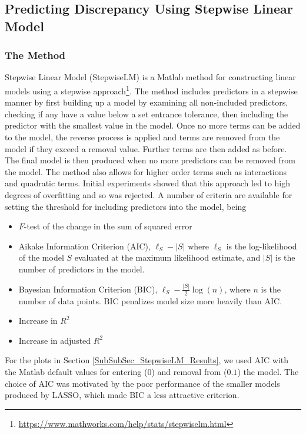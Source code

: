 \documentclass[11pt,a4paper,oneside]{article}
\begin{document}
\clearpage

\subsection{Predicting Discrepancy Using Stepwise Linear Model}\label{SubSec_StepwiseLM_Discrepancy}
\subsubsection{The Method}
Stepwise Linear Model (StepwiseLM) is a Matlab method for constructing linear models using a stepwise approach\footnote{\url{https://www.mathworks.com/help/stats/stepwiselm.html}}. The method includes predictors in a stepwise manner by first building  up a model by examining all non-included predictors, checking if any have a value below a set entrance tolerance, then including the predictor with the smallest value in the model. Once no more terms can be added to the model, the reverse process is applied and terms are removed from the model if they exceed a removal value. Further terms are then added as before. The final model is then produced when no more predictors can be removed from the model. The method also allows for higher order terms such as interactions and quadratic terms. Initial experiments showed that this approach led to high degrees of overfitting and so was rejected. A number of criteria are available for setting the threshold for including predictors into the model\cite{Wasserman2010}, being
\begin{itemize}
\item $F$-test of the change in the sum of squared error 
\item Aikake Information Criterion (AIC), $\ell_S-|S|$ where $\ell_S$ is the log-likelihood of the model $S$ evaluated at the maximum likelihood estimate, and $|S|$ is the number of predictors in the model.
\item Bayesian Information Criterion (BIC), $\ell_S-\frac{|S|}{2} \log( n )$, where $n$ is the number of data points. BIC penalizes model size more heavily than AIC.
\item Increase in $R^2$
\item Increase in adjusted $R^2$
\end{itemize}
For the plots in Section \ref{SubSubSec_StepwiseLM_Results}, we used AIC with the Matlab default values for entering ($0$) and removal from ($0.1$) the model. The choice of AIC was motivated by the poor performance of the smaller models produced by LASSO, which made BIC a less attractive criterion.
\end{document}
